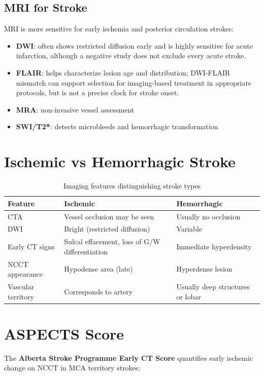 \subsection{MRI for Stroke}
MRI is more sensitive for early ischemia and posterior circulation strokes:
\begin{itemize}
  \item \textbf{DWI}: often shows restricted diffusion early and is highly sensitive for acute infarction, although a negative study does not exclude every acute stroke.
  \item \textbf{FLAIR}: helps characterize lesion age and distribution; DWI-FLAIR mismatch can support selection for imaging-based treatment in appropriate protocols, but is not a precise clock for stroke onset.
  \item \textbf{MRA}: non-invasive vessel assessment
  \item \textbf{SWI/T2*}: detects microbleeds and hemorrhagic transformation
\end{itemize}

\section{Ischemic vs Hemorrhagic Stroke}

\begin{table}[h]
\centering
\caption{Imaging features distinguishing stroke types}
\begin{tabular}{|p{}|p{}|p{}|}
\hline
\textbf{Feature} & \textbf{Ischemic} & \textbf{Hemorrhagic} \\
\hline
CTA & Vessel occlusion may be seen & Usually no occlusion \\
DWI & Bright (restricted diffusion) & Variable \\
Early CT signs & Sulcal effacement, loss of G/W differentiation & Immediate hyperdensity \\
NCCT appearance & Hypodense area (late) & Hyperdense lesion \\
Vascular territory & Corresponds to artery & Usually deep structures or lobar \\
\hline
\end{tabular}
\end{table}

\section{ASPECTS Score}
The \textbf{Alberta Stroke Programme Early CT Score} quantifies early ischemic change on NCCT in MCA territory strokes:

